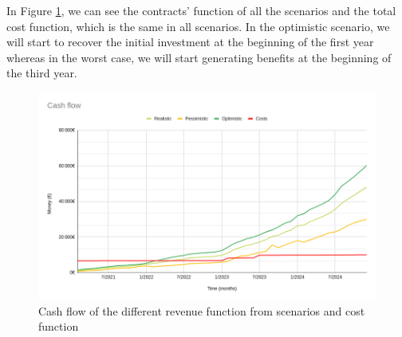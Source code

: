 In Figure \ref{fig:cashflow}, we can see the contracts’ function of all the scenarios and the total cost function, which is the same in all scenarios. In the optimistic scenario, we will start to recover the initial investment at the beginning of the first year whereas in the worst case, we will start generating benefits at the beginning of the third year.
\begin{figure}
	\centering
	\includegraphics[width=15cm]{CashFlow.png}
	\caption{Cash flow of the different revenue function from scenarios and cost function}
	\label{fig:cashflow}
\end{figure}

